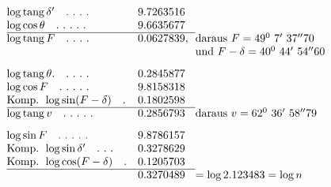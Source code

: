 \[
\begin{array}{@{}l@{\quad}r@{}l@{\hspace{.65em}}l@{}}
\log\operatorname{tang}\delta'\quad .\ .\ .\ .&9.7263516&&\\
\log\cos\theta\quad .\ .\ .\ .\ .&9.6635677&&\\\cline{1-3}
\log\operatorname{tang}F\quad .\ .\ .\ .&0.0627839&,&\text{daraus }F=49^0\ 7'\ 37''70\\
&&&\text{und }F-\delta=40^0\ 44'\ 54''60\\[8pt]
\log\operatorname{tang}\theta.\quad .\ .\ .\ .&0.2845877&&\\
\log\cos F\quad .\ .\ .\ .\ .&9.8158318&&\\
\text{Komp. }\log\sin(F-\delta)\quad .&0.1802598&&\\\cline{1-3}
\log\operatorname{tang}v\quad .\ .\ .\ .\ .&0.2856793&&\text{daraus }v=62^0\ 36'\ 58''79\\[8pt]
\log\sin F\quad .\ .\ .\ .\ .&9.8786157&&\\
\text{Komp. }\log\sin\delta'\quad .\ .\ .&0.3278629&&\\
\text{Komp. }\log\cos(F-\delta)\quad .&0.1205703&&\\\cline{1-3}
&0.3270489&&=\log 2.123483=\log n
\end{array}
\]
\endgroup
